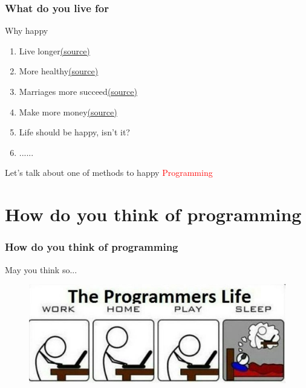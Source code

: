 \documentclass{beamer}
\begin{document}
\begin{frame}
  \frametitle{What do you live for}
  \begin{alertblock}{Why happy}
    \begin{enumerate}
    \item Live longer\href{http://happyproject.in/message/advantage-happy/}{(source)}
    \item More healthy\href{http://happyproject.in/message/advantage-happy/}{(source)}
    \item Marriages more succeed\href{http://happyproject.in/message/advantage-happy/}{(source)}
    \item Make more
      money\href{https://www.inc.com/rhett-power/10-reasons-why-it-is-important-create-a-happy-workplace.html}{(source)}
    \item Life should be happy, isn't it?
    \item ......
    \end{enumerate}
  \end{alertblock}

  
  \begin{center}
    \LARGE{Let's talk about one of methods to happy}
    \huge{\textcolor{red}{Programming}}
  \end{center}
  
\end{frame}



\section{How do you think of programming}
\begin{frame}
  \frametitle{How do you think of programming}
  \begin{center}
    \huge{May you think so...}
    \begin{figure}
      \includegraphics[scale=.38]{./img/pain11.png}
    \end{figure}
  \end{center}
\end{frame}
\end{document}
